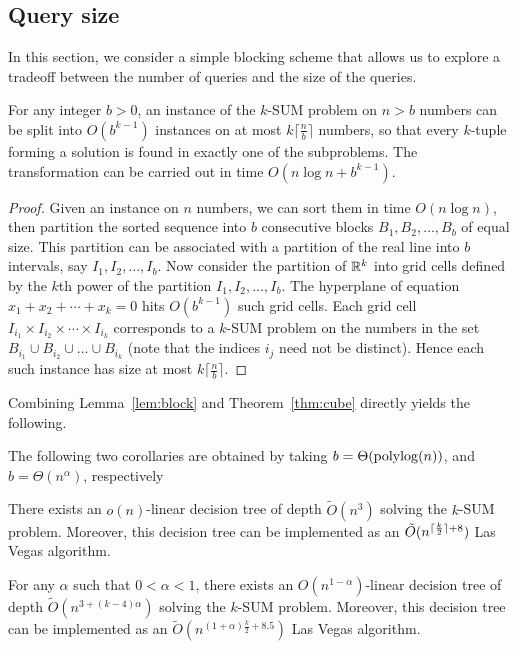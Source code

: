 \subsection{Query size}
\label{sec:query-size}

In this section, we consider a simple blocking scheme that allows us to explore
a tradeoff between the number of queries and the size of the queries.

\begin{lemma}
\label{lem:block}
For any integer $b>0$, an instance of the \(k\)-SUM problem on $n>b$ numbers can be split into
$O(b^{k-1})$ instances on at most $k\lceil \frac{n}{b}\rceil$ numbers, so that every $k$-tuple
forming a solution is found in exactly one of the subproblems.
The transformation can be carried out in time $O(n\log n + b^{k-1})$.
\end{lemma}
\begin{proof}
Given an instance on $n$ numbers, we can sort them in time $O(n\log n)$, then partition
the sorted sequence into \(b\) consecutive blocks \(B_1, B_2,\ldots ,B_b\) of equal size.
This partition can be associated with a partition of the real line
into $b$ intervals, say $I_1, I_2,\ldots ,I_b$. Now consider the partition of $\mathbb{R}^k$
into grid cells defined by the $k$th power of the partition $I_1, I_2,\ldots ,I_b$. The
hyperplane of equation $x_1 + x_2 +\cdots +x_k = 0$ hits $O(b^{k-1})$ such grid cells.
Each grid cell $I_{i_1}\times I_{i_2}\times \cdots \times I_{i_k}$ corresponds to a
\(k\)-SUM problem on the numbers in the set $B_{i_1}\cup B_{i_2}\cup \ldots \cup B_{i_k}$ (note that
the indices $i_j$ need not be distinct). Hence each such instance has size at most $k\lceil \frac{n}{b}\rceil$.
\end{proof}

Combining Lemma~\ref{lem:block} and Theorem~\ref{thm:cube} directly yields the following.


The following two corollaries are obtained by taking
$b=\Theta(\operatorname{polylog}(n))$, and $b=\Theta(n^{\alpha})$, respectively
\begin{corollary}\label{cor:logn}
There exists an $o(n)$-linear decision tree of
depth $\tilde{O}(n^3)$ solving the \(k\)-SUM problem.
Moreover, this decision tree can be implemented as an
$\tilde{O}(n^{\lceil\frac{k}{2}\rceil+8})$ Las Vegas algorithm.
\end{corollary}
\begin{corollary}\label{cor:ne}
For any $\alpha$ such that $0<\alpha<1$,
there exists an $O(n^{1-\alpha})$-linear decision tree of
depth $\tilde{O} (n^{3+(k-4)\alpha})$ solving the \(k\)-SUM problem.
Moreover, this decision tree can be implemented as an
$\tilde{O}(n^{(1+\alpha)\frac{k}{2} + 8.5})$
Las Vegas algorithm.
\end{corollary}

